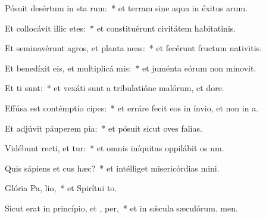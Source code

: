 \item Pósuit desértum in sta rum:~* et terram sine aqua in éxitus arum.
\item Et collocávit illic etes:~* et constituérunt civitátem habitatinis.
\item Et seminavérunt agros, et planta neas:~* et fecérunt fructum nativitis.
\item Et benedíxit eis, et multiplicá  mis:~* et juménta eórum non minovit.
\item Et  ti sunt:~* et vexáti sunt a tribulatióne malórum, et dore.
\item Effúsa est contémptio  cipes:~* et erráre fecit eos in ínvio, et non in a.
\item Et adjúvit páuperem  pia:~* et pósuit sicut oves falias.
\item Vidébunt recti, et tur:~* et omnis iníquitas oppilábit os um.
\item Quis sápiens et cus hæc?~* et intélliget misericórdias mini.
\item Glória Pa,  lio,~* et Spirítui to.
\item Sicut erat in princípio, et ,  per,~* et in sǽcula sæculórum. men.
